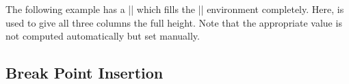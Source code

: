 The following example has a |\tcolorbox| which fills the |\multicols|
environment completely. Here,  is used
to give all three columns the full height.
Note that the appropriate  value is not computed
automatically but set manually.

\begin{dispListing}
\small
\begin{multicols}{3}
  \begin{tcolorbox}[enhanced jigsaw,breakable,size=small,
    colback=red!5!white,colframe=red!75!black,fonttitle=\bfseries,
    title=My breakable box,pad at break=2mm,drop fuzzy shadow,
    height fixed for=all, break at=11.4cm ]
  \lipsum[1-3]
  \end{tcolorbox}
\end{multicols}
\end{dispListing}
{\tcbusetemp}

\clearpage
\subsection{Break Point Insertion}\label{subsec:breakpoints}

